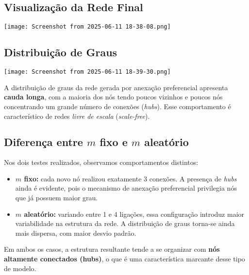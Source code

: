 \documentclass{article}
\begin{document}
\newpage

\subsection*{Visualização da Rede Final}

\begin{center}
    \texttt{[image: Screenshot from 2025-06-11 18-38-08.png]}
\end{center}

\vspace{0.5cm}
\subsection*{Distribuição de Graus}

\begin{center}
    \texttt{[image: Screenshot from 2025-06-11 18-39-30.png]}
\end{center}

A distribuição de graus da rede gerada por anexação preferencial apresenta \textbf{cauda longa}, com a maioria dos nós tendo poucos vizinhos e poucos nós concentrando um grande número de conexões (\textit{hubs}). Esse comportamento é característico de redes \textit{livre de escala} (\textit{scale-free}).

\newpage

\subsection*{Diferença entre $m$ fixo e $m$ aleatório}

Nos dois testes realizados, observamos comportamentos distintos:

\begin{itemize}
    \item \textbf{$m$ fixo:} cada novo nó realizou exatamente 3 conexões. A presença de \textit{hubs} ainda é evidente, pois o mecanismo de anexação preferencial privilegia nós que já possuem maior grau.
    \item \textbf{$m$ aleatório:} variando entre 1 e 4 ligações, essa configuração introduz maior variabilidade na estrutura da rede. A distribuição de graus torna-se ainda mais dispersa, com maior desvio padrão.
\end{itemize}

Em ambos os casos, a estrutura resultante tende a se organizar com \textbf{nós altamente conectados (hubs)}, o que é uma característica marcante desse tipo de modelo.
\end{document}
